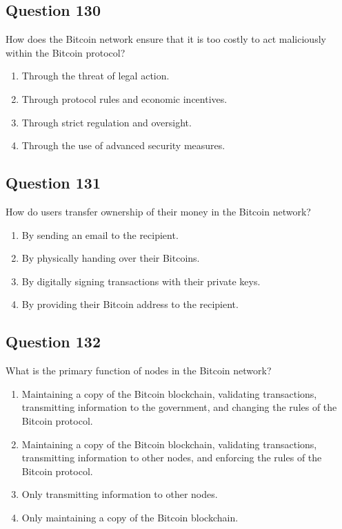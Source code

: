 \documentclass[12pt,a4paper]{article}
\begin{document}
\bigskip


\subsection*{Question 130}
How does the Bitcoin network ensure that it is too costly to act maliciously within the Bitcoin protocol?

\begin{enumerate}[label=\Alph*., leftmargin=*]
\item Through the threat of legal action.
\item Through protocol rules and economic incentives.
\item Through strict regulation and oversight.
\item Through the use of advanced security measures.
\end{enumerate}

\bigskip


\subsection*{Question 131}
How do users transfer ownership of their money in the Bitcoin network?

\begin{enumerate}[label=\Alph*., leftmargin=*]
\item By sending an email to the recipient.
\item By physically handing over their Bitcoins.
\item By digitally signing transactions with their private keys.
\item By providing their Bitcoin address to the recipient.
\end{enumerate}

\bigskip


\subsection*{Question 132}
What is the primary function of nodes in the Bitcoin network?

\begin{enumerate}[label=\Alph*., leftmargin=*]
\item Maintaining a copy of the Bitcoin blockchain, validating transactions, transmitting information to the government, and changing the rules of the Bitcoin protocol.
\item Maintaining a copy of the Bitcoin blockchain, validating transactions, transmitting information to other nodes, and enforcing the rules of the Bitcoin protocol.
\item Only transmitting information to other nodes.
\item Only maintaining a copy of the Bitcoin blockchain.
\end{enumerate}
\end{document}
